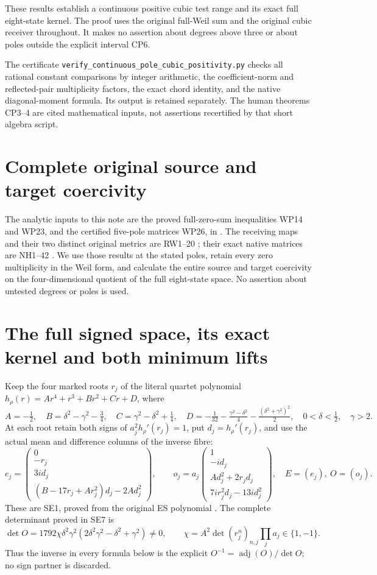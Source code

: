 \documentclass[11pt]{article}
\begin{document}
These results establish a continuous positive cubic test
range and its exact full eight-state kernel. The proof uses
the original full-Weil sum and the original cubic receiver
throughout. It makes no assertion about degrees above three
or about poles outside the explicit interval CP6.

The certificate
\texttt{verify\_continuous\_pole\_cubic\_positivity.py}
checks all rational constant comparisons by integer arithmetic,
the coefficient-norm and reflected-pair multiplicity factors,
the exact chord identity, and the native diagonal-moment formula.
Its output is retained separately. The human theorems CP3--4
are cited mathematical inputs, not assertions recertified by
that short algebra script.

\section{Complete original source and target coercivity}
The analytic inputs to this note are the proved full-zero-sum
inequalities WP14 and WP23, and the certified five-pole matrices
WP26, in \cite{WeilCertificates}. The receiving maps and their two distinct
original metrics are RW1--20 \cite{Fable029}; their exact native
matrices are NH1--42 \cite{Fable029}. We use those results at the
stated poles, retain every zero multiplicity in the Weil form,
and calculate the entire source and target coercivity on the
four-dimensional quotient of the full eight-state space.
No assertion about untested degrees or poles is used.

\section{The full signed space, its exact kernel and both minimum lifts}
Keep the four marked roots $r_j$ of the literal quartet polynomial
$h_\rho(r)=Ar^4+r^3+Br^2+Cr+D$, where
\[
 A=-\tfrac12,\quad B=\delta^2-\gamma^2-\tfrac34,\quad
 C=\gamma^2-\delta^2+\tfrac14,\quad
 D=-\tfrac1{32}-\tfrac{\gamma^2-\delta^2}{4}
                         -\tfrac{(\delta^2+\gamma^2)^2}{2},
 \quad0<\delta<\tfrac12,\quad\gamma>2.
\]
At each root retain both signs of $a_j^2h_\rho'(r_j)=1$,
put $d_j=h_\rho'(r_j)$, and use the actual mean and difference
columns of the inverse fibre:
\[
 e_j=\begin{pmatrix}0\\-r_j\\3id_j\\
 (B-17r_j+Ar_j^2)d_j-2Ad_j^2\end{pmatrix},\qquad
 o_j=a_j\begin{pmatrix}1\\-id_j\\Ad_j^2+2r_jd_j\\
 7ir_j^2d_j-13id_j^2\end{pmatrix},\quad E=(e_j),\ O=(o_j).
 \tag{NW1}
\]
These are SE1, proved from the original ES polynomial
\cite{ES488,Fable029}. The complete determinant proved in SE7 is
\[
 \det O=1792\chi\delta^2\gamma^2
 (2\delta^2\gamma^2-\delta^2+\gamma^2)\ne0,
 \qquad \chi=A^2\det(r_j^n)_{n,j}\prod_ja_j\in\{1,-1\}.
\]
Thus the inverse in every formula below is the explicit
$O^{-1}=\operatorname{adj}(O)/\det O$; no sign partner is
discarded.
\end{document}
